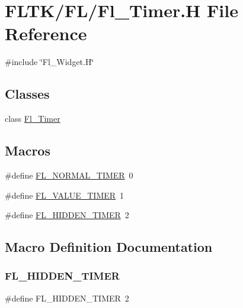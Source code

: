 \hypertarget{_fl___timer_8_h}{}\section{F\+L\+T\+K/\+F\+L/\+Fl\+\_\+\+Timer.H File Reference}
\label{_fl___timer_8_h}
{\ttfamily \#include \char`\"{}Fl\+\_\+\+Widget.\+H\char`\"{}}\newline
\subsection*{Classes}
\begin{DoxyCompactItemize}
\item 
class \hyperlink{class_fl___timer}{Fl\+\_\+\+Timer}
\end{DoxyCompactItemize}
\subsection*{Macros}
\begin{DoxyCompactItemize}
\item 
\#define \hyperlink{_fl___timer_8_h_aef86cca939bb0b395efd44d1654e09ef}{F\+L\+\_\+\+N\+O\+R\+M\+A\+L\+\_\+\+T\+I\+M\+ER}~0
\item 
\#define \hyperlink{_fl___timer_8_h_a72a5b6d7499dbd6c07f6e6f804e58872}{F\+L\+\_\+\+V\+A\+L\+U\+E\+\_\+\+T\+I\+M\+ER}~1
\item 
\#define \hyperlink{_fl___timer_8_h_a3c0f2bacbb4db1659913b7c1d330937c}{F\+L\+\_\+\+H\+I\+D\+D\+E\+N\+\_\+\+T\+I\+M\+ER}~2
\end{DoxyCompactItemize}


\subsection{Macro Definition Documentation}
\mbox{\label{_fl___timer_8_h_a3c0f2bacbb4db1659913b7c1d330937c}} 
\subsubsection{\texorpdfstring{F\+L\+\_\+\+H\+I\+D\+D\+E\+N\+\_\+\+T\+I\+M\+ER}{FL\_HIDDEN\_TIMER}}
{\footnotesize\ttfamily \#define F\+L\+\_\+\+H\+I\+D\+D\+E\+N\+\_\+\+T\+I\+M\+ER~2}

